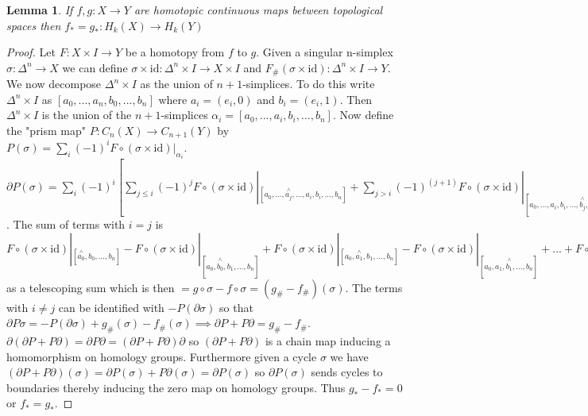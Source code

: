 \documentclass{report}
\newtheorem{lemma}{Lemma}
\begin{document}
\begin{lemma}
If $f,g\colon X\to Y$ are homotopic continuous maps between topological spaces then $f_*=g_*\colon H_k(X)\to H_k(Y)$
\end{lemma}
\begin{proof}
Let $F\colon X\times I\to Y$ be a homotopy from $f$ to $g$. Given a singular n-simplex $\sigma\colon\Delta^n\to X$ we can define $\sigma\times\text{id}\colon\Delta^n\times I\to X\times I$ and $F_\#(\sigma\times\text{id})\colon\Delta^n\times I\to Y$. We now decompose $\Delta^n\times I$ as the union of $n+1$-simplices. To do this write $\Delta^n\times I$ as $[a_0,...,a_n,b_0,...,b_n]$ where $a_i=(e_i,0)$ and $b_i=(e_i,1)$. Then $\Delta^n\times I$ is the union of the $n+1$-simplices $\alpha_i=[a_0,...,a_i,b_i,...,b_n]$. Now define the "prism map" $P\colon C_n(X)\to C_{n+1}(Y)$ by $P(\sigma)=\sum_i(-1)^iF\circ(\sigma\times\text{id})|_{\alpha_i}$. $\partial P(\sigma)=\sum_i(-1)^i[\sum_{j\leq i}(-1)^jF\circ(\sigma\times\text{id})|_{[a_0,...,\overset{\wedge}{a_j},...,a_i,b_i,...,b_n]}+\sum_{j> i}(-1)^{(j+1)}F\circ(\sigma\times\text{id})|_{[a_0,...,a_i,b_i,...,\overset{\wedge}{b_j},...,b_n]}]$. The sum of terms with $i=j$ is $F\circ(\sigma\times\text{id})|_{[\overset{\wedge}{a_0},b_0,...,b_n]}-F\circ(\sigma\times\text{id})|_{[a_0,\overset{\wedge}{b_0},b_1,...,b_n]}+F\circ(\sigma\times\text{id})|_{[a_0,\overset{\wedge}{a_1},b_1,...,b_n]}-F\circ(\sigma\times\text{id})|_{[a_0,a_1,\overset{\wedge}{b_1},...,b_n]}+...+F\circ(\sigma\times\text{id})|_{[a_0,...,\overset{\wedge}{a_n},b_n]}-F\circ(\sigma\times\text{id})|_{[a_0,...,a_n,\overset{\wedge}{b_n}]}=F\circ(\sigma\times\text{id})|_{[\overset{\wedge}{a_0},b_0,...,b_n]}-F\circ(\sigma\times\text{id})|_{[a_0,...,a_n,\overset{\wedge}{b_n}]}=F\circ(\sigma\times\text{id})|_{[b_0,...,b_n]}-F\circ(\sigma\times\text{id})|_{[a_0,...,a_n]}$ as a telescoping sum which is then $=g\circ\sigma-f\circ\sigma=(g_\#-f_\#)(\sigma)$. The terms with $i\neq j$ can be identified with $-P(\partial\sigma)$ so that $\partial P\sigma=-P(\partial\sigma)+g_\#(\sigma)-f_\#(\sigma)\implies\partial P + P\partial=g_\#-f_\#$. $\partial(\partial P + P\partial)=\partial P\partial=(\partial P + P\partial)\partial$ so $(\partial P + P\partial)$ is a chain map inducing a homomorphism on homology groups. Furthermore given a cycle $\sigma$ we have $(\partial P + P\partial)(\sigma)=\partial P(\sigma) + P\partial(\sigma)=\partial P(\sigma)$ so $\partial P(\sigma)$ sends cycles to boundaries thereby inducing the zero map on homology groups. Thus $g_*-f_*=0$ or $f_*=g_*$.
\end{proof}
\end{document}
